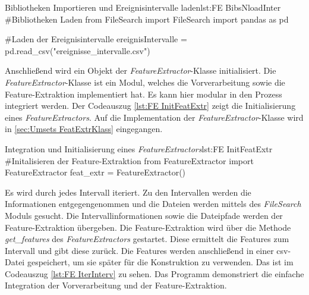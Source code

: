 \begin{pythoncode}{Bibliotheken Importieren und Ereignisintervalle laden}{lst:FE BibsNloadInter}
#Bibliotheken Laden
from FileSearch import FileSearch
import pandas as pd

#Laden der Ereignisintervalle
ereignisIntervalle = pd.read_csv("ereignisse_intervalle.csv")
\end{pythoncode}

Anschließend wird ein Objekt der \textit{FeatureExtractor}-Klasse initialisiert. Die \textit{FeatureExtractor}-Klasse ist ein Modul, welches die Vorverarbeitung sowie die Feature-Extraktion implementiert hat. Es kann hier modular in den Prozess integriert werden. Der Codeauszug \ref{lst:FE InitFeatExtr} zeigt die Initialisierung eines \textit{FeatureExtractors}. Auf die Implementation der \textit{FeatureExtractor}-Klasse wird in \autoref{sec:Umsets FeatExtrKlass} eingegangen.

\begin{pythoncode}{Integration und Initialisierung eines \textit{FeatureExtractors}}{lst:FE InitFeatExtr}
#Initalisieren der Feature-Extraktion
from FeatureExtractor import FeatureExtractor
feat_extr = FeatureExtractor()
\end{pythoncode}

Es wird durch jedes Intervall iteriert. Zu den Intervallen werden die Informationen entgegengenommen und die Dateien werden mittels des \textit{FileSearch} Moduls gesucht. Die Intervallinformationen sowie die Dateipfade werden der Feature-Extraktion übergeben. Die Feature-Extraktion wird über die Methode \textit{get\_features} des \textit{FeatureExtractors} gestartet. Diese ermittelt die Features zum Intervall und gibt diese zurück. Die Features werden anschließend in einer csv-Datei gespeichert, um sie später für die Konstruktion zu verwenden. Das ist im Codeauszug \ref{lst:FE IterInterv} zu sehen. Das Programm demonstriert die einfache Integration der Vorverarbeitung und der Feature-Extraktion. 

